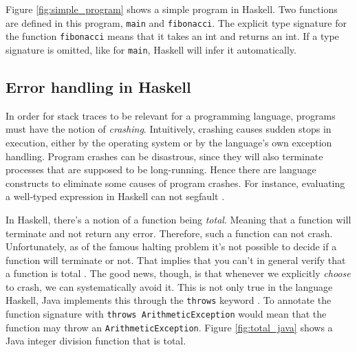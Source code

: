 Figure \ref{fig:simple_program} shows a simple program in Haskell.
Two functions are defined in this program, \texttt{main} and
\texttt{fibonacci}.  The explicit type signature for the function
\texttt{fibonacci} means that it takes an int and returns an int. If a type
signature is omitted, like for \texttt{main}, Haskell will infer it automatically.

\subsection{Error handling in Haskell}

In order for stack traces to be relevant for a programming language, programs
must have the notion of \emph{crashing}. Intuitively, crashing causes sudden
stops in execution, either by the operating system or by the language's own
exception handling. Program crashes can be disastrous, since they will also
terminate processes that are supposed to be long-running. Hence there are
language constructs to eliminate some causes of program crashes.
For instance,
evaluating a well-typed expression in Haskell can not segfault \cite{FindingTheNeedle2009}.

In Haskell, there's a notion of a function being \emph{total}. Meaning
that a function will terminate and not return any error. Therefore,
such a function can not crash. Unfortunately, as of the famous halting
problem it's not possible to decide if a function will terminate or not.
That implies that you can't in general
verify that a function is total \cite[p.380]{Hopcroft:2000}.
The good news, though, is that whenever we
explicitly \emph{choose} to crash, we can systematically avoid it. This is not
only true in the language Haskell, Java implements this through the
\texttt{throws} keyword \cite{oracle_java_doc_method_throws}. 
To annotate the function signature with \texttt{throws ArithmeticException}
would mean that the function may throw an \texttt{ArithmeticException}.
Figure \ref{fig:total_java} shows a Java integer division function that
is total.

